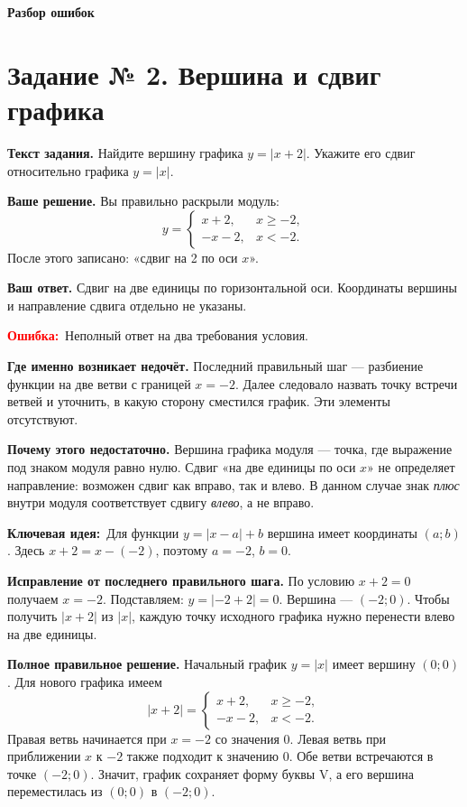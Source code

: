 \documentclass[12pt,a4paper]{article}
\newcommand{\err}{\textcolor{red}{\textbf{Ошибка:}}}
\newcommand{\idea}{\textcolor{blue!60!black}{\textbf{Ключевая идея:}}}
\begin{document}
\clearpage
\vspace*{\fill}
\begin{center}
{\Huge\bfseries Разбор ошибок}
\end{center}
\vspace*{\fill}
\clearpage

\label{task:2}
\section*{Задание № 2. Вершина и сдвиг графика}
\textbf{Текст задания.} Найдите вершину графика $y=|x+2|$. Укажите его сдвиг относительно графика $y=|x|$.

\textbf{Ваше решение.} Вы правильно раскрыли модуль:
\[
y=\begin{cases}x+2,&x\geqslant-2,\\-x-2,&x<-2.\end{cases}
\]
После этого записано: «сдвиг на 2 по оси $x$».

\textbf{Ваш ответ.} Сдвиг на две единицы по горизонтальной оси. Координаты вершины и направление сдвига отдельно не указаны.

\err\ Неполный ответ на два требования условия.

\textbf{Где именно возникает недочёт.} Последний правильный шаг --- разбиение функции на две ветви с границей $x=-2$. Далее следовало назвать точку встречи ветвей и уточнить, в какую сторону сместился график. Эти элементы отсутствуют.

\textbf{Почему этого недостаточно.} Вершина графика модуля --- точка, где выражение под знаком модуля равно нулю. Сдвиг «на две единицы по оси $x$» не определяет направление: возможен сдвиг как вправо, так и влево. В данном случае знак \emph{плюс} внутри модуля соответствует сдвигу \emph{влево}, а не вправо.

\idea\ Для функции $y=|x-a|+b$ вершина имеет координаты $(a;b)$. Здесь $x+2=x-(-2)$, поэтому $a=-2$, $b=0$.

\textbf{Исправление от последнего правильного шага.} По условию $x+2=0$ получаем $x=-2$. Подставляем: $y=|-2+2|=0$. Вершина --- $(-2;0)$. Чтобы получить $|x+2|$ из $|x|$, каждую точку исходного графика нужно перенести влево на две единицы.

\textbf{Полное правильное решение.} Начальный график $y=|x|$ имеет вершину $(0;0)$. Для нового графика имеем
\[
|x+2|=\begin{cases}x+2,&x\geqslant-2,\\-x-2,&x<-2.\end{cases}
\]
Правая ветвь начинается при $x=-2$ со значения $0$. Левая ветвь при приближении $x$ к $-2$ также подходит к значению $0$. Обе ветви встречаются в точке $(-2;0)$. Значит, график сохраняет форму буквы V, а его вершина переместилась из $(0;0)$ в $(-2;0)$.
\end{document}

